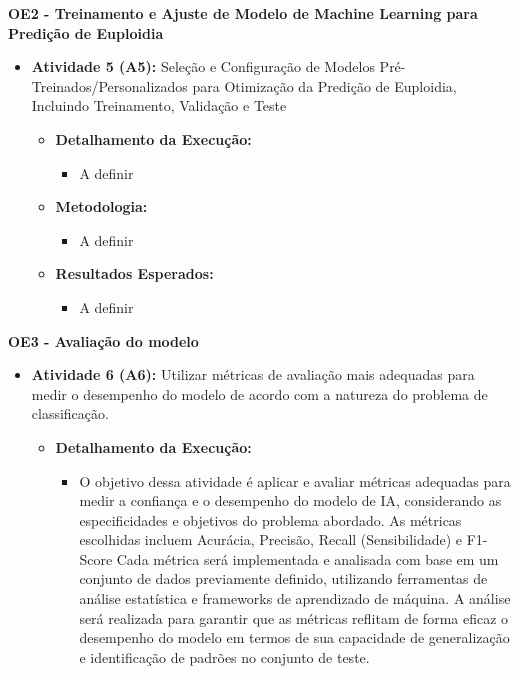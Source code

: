 

%     

\begin{itemize}
  \textbf{OE2 - Treinamento e Ajuste de Modelo de Machine Learning para Predição de Euploidia}
  \begin{itemize}
      \item \textbf{Atividade 5 (A5):} Seleção e Configuração de Modelos Pré-Treinados/Personalizados para Otimização da Predição de Euploidia, Incluindo Treinamento, Validação e Teste
      \begin{itemize}
        \item \textbf{Detalhamento da Execução:} 
        \begin{itemize}
          \item A definir
        \end{itemize}

        \item \textbf{Metodologia:} 
        \begin{itemize}
          \item A definir
        \end{itemize}

        \item \textbf{Resultados Esperados:} 
        \begin{itemize}
          \item A definir
        \end{itemize}
      \end{itemize}
\end{itemize}

\begin{itemize}
  \textbf{OE3 - Avaliação do modelo}
  \begin{itemize}
      \item \textbf{Atividade 6 (A6):} Utilizar métricas de avaliação mais adequadas para medir o desempenho do modelo de acordo com a natureza do problema de classificação.
      \begin{itemize}
        \item \textbf{Detalhamento da Execução:} 
        \begin{itemize}
          \item O objetivo dessa atividade é aplicar e avaliar métricas adequadas para medir a confiança e o desempenho do modelo de IA, considerando as especificidades e objetivos do problema abordado. As métricas escolhidas incluem Acurácia, Precisão, Recall (Sensibilidade) e F1-Score Cada métrica será implementada e analisada com base em um conjunto de dados previamente definido, utilizando ferramentas de análise estatística e frameworks de aprendizado de máquina. A análise será realizada para garantir que as métricas reflitam de forma eficaz o desempenho do modelo em termos de sua capacidade de generalização e identificação de padrões no conjunto de teste.
        \end{itemize}


\end{itemize}
\end{itemize}
\end{itemize}
\end{itemize}
